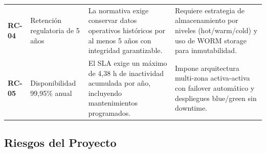 \documentclass[12pt, letterpaper]{article}
\begin{document}
\begin{longtable}{
  C{1.5cm}
  P{2.8cm}
  P{4.8cm}
  P{4.6cm}
}
\textbf{RC-04} & Retención regulatoria de 5 años &
  La normativa exige conservar datos operativos históricos por al menos 5 años con
  integridad garantizable. &
  Requiere estrategia de almacenamiento por niveles (hot/warm/cold) y uso de WORM
  storage para inmutabilidad. \\

\textbf{RC-05} & Disponibilidad 99,95\% anual &
  El SLA exige un máximo de 4,38 h de inactividad acumulada por año, incluyendo
  mantenimientos programados. &
  Impone arquitectura multi-zona activa-activa con failover automático y despliegues
  blue/green sin downtime. \\

\end{longtable}

\subsection{Riesgos del Proyecto}
\end{document}
